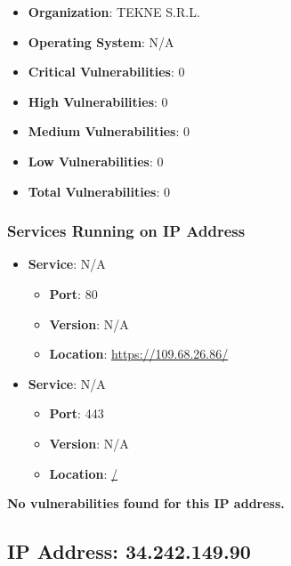\documentclass{article}
\begin{document}
\begin{itemize}
    \item \textbf{Organization}: TEKNE S.R.L.
    \item \textbf{Operating System}:  N/A 
    \item \textbf{Critical Vulnerabilities}: 0
    \item \textbf{High Vulnerabilities}: 0
    \item \textbf{Medium Vulnerabilities}: 0
    \item \textbf{Low Vulnerabilities}: 0
    \item \textbf{Total Vulnerabilities}: 0
\end{itemize}

\subsubsection*{Services Running on IP Address}

\begin{itemize}
    
        \item \textbf{Service}: N/A
        \begin{itemize}
            \item \textbf{Port}: 80
            \item \textbf{Version}:  N/A 
            \item \textbf{Location}: \href{ https://109.68.26.86/ }{ https://109.68.26.86/ }
        \end{itemize}
    
        \item \textbf{Service}: N/A
        \begin{itemize}
            \item \textbf{Port}: 443
            \item \textbf{Version}:  N/A 
            \item \textbf{Location}: \href{ / }{ / }
        \end{itemize}
    
\end{itemize}


\textbf{No vulnerabilities found for this IP address.}




\clearpage



\subsection*{IP Address: 34.242.149.90}
\end{document}
